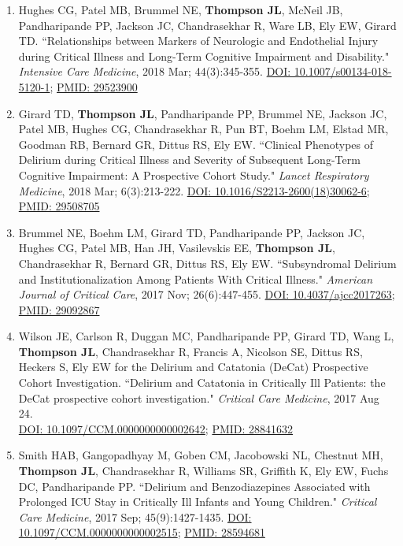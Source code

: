 \documentclass[5pt]{article}
\begin{document}
\begin{enumerate}
\item Hughes CG, Patel MB, Brummel NE, \textbf{Thompson JL}, McNeil JB, Pandharipande PP, Jackson JC, Chandrasekhar R, Ware LB, Ely EW, Girard TD. ``Relationships between Markers of Neurologic and Endothelial Injury during Critical Illness and Long-Term Cognitive Impairment and Disability." \emph{Intensive Care Medicine}, 2018 Mar; 44(3):345-355. \href{https://doi.org/10.1007/s00134-018-5120-1}{DOI: 10.1007/s00134-018-5120-1}; \href{https://www.ncbi.nlm.nih.gov/pubmed/29523900}{PMID: 29523900}
\item Girard TD, \textbf{Thompson JL}, Pandharipande PP, Brummel NE, Jackson JC, Patel MB, Hughes CG, Chandrasekhar R, Pun BT, Boehm LM, Elstad MR, Goodman RB, Bernard GR, Dittus RS, Ely EW. ``Clinical Phenotypes of Delirium during Critical Illness and Severity of Subsequent Long-Term Cognitive Impairment: A Prospective Cohort Study." \emph{Lancet Respiratory Medicine}, 2018 Mar; 6(3):213-222. \href{https://doi.org/10.1016/S2213-2600(18)30062-6}{DOI: 10.1016/S2213-2600(18)30062-6}; \href{https://www.ncbi.nlm.nih.gov/pubmed/29508705}{PMID: 29508705}
\item Brummel NE, Boehm LM, Girard TD, Pandharipande PP, Jackson JC, Hughes CG, Patel MB, Han JH, Vasilevskis EE, \textbf{Thompson JL}, Chandrasekhar R, Bernard GR, Dittus RS, Ely EW. ``Subsyndromal Delirium and Institutionalization Among Patients With Critical Illness." \emph{American Journal of Critical Care}, 2017 Nov; 26(6):447-455. \href{https://doi.org/10.4037/ajcc2017263}{DOI: 10.4037/ajcc2017263}; \href{https://www.ncbi.nlm.nih.gov/pubmed/29092867}{PMID: 29092867}
\item Wilson JE, Carlson R, Duggan MC, Pandharipande PP, Girard TD, Wang L, \textbf{Thompson JL}, Chandrasekhar R, Francis A, Nicolson SE, Dittus RS, Heckers S, Ely EW for the Delirium and Catatonia (DeCat) Prospective Cohort Investigation. ``Delirium and Catatonia in Critically Ill Patients: the DeCat prospective cohort investigation." \emph{Critical Care Medicine}, 2017 Aug 24.\\ \href{https://doi.org/10.1097/CCM.0000000000002642}{DOI: 10.1097/CCM.0000000000002642}; \href{https://www.ncbi.nlm.nih.gov/pubmed/28841632}{PMID: 28841632}
\item Smith HAB, Gangopadhyay M, Goben CM, Jacobowski NL, Chestnut MH, \textbf{Thompson JL}, Chandrasekhar R, Williams SR, Griffith K, Ely EW, Fuchs DC, Pandharipande PP. ``Delirium and Benzodiazepines Associated with Prolonged ICU Stay in Critically Ill Infants and Young Children." \emph{Critical Care Medicine}, 2017 Sep; 45(9):1427-1435. \href{https://doi.org/10.1097/CCM.0000000000002515}{DOI: 10.1097/CCM.0000000000002515}; \href{https://www.ncbi.nlm.nih.gov/pubmed/28594681}{PMID: 28594681}

\end{enumerate}
\end{document}
